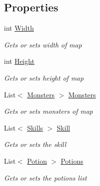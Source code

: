 \subsection*{Properties}
\begin{DoxyCompactItemize}
\item 
int \hyperlink{class_lightdeath_1_1_maps_a7f64d70e6c35d3c3e40f344aaa86c524}{Width}
\begin{DoxyCompactList}\small\item\em Gets or sets width of map \end{DoxyCompactList}\item 
int \hyperlink{class_lightdeath_1_1_maps_a889e0089e6b8bf717cad36a5e8724d3f}{Height}
\begin{DoxyCompactList}\small\item\em Gets or sets height of map \end{DoxyCompactList}\item 
List$<$ \hyperlink{class_lightdeath_1_1_monsters}{Monsters} $>$ \hyperlink{class_lightdeath_1_1_maps_a90188e7f4e8ffd7e90e4121a3f2ec114}{Monsters}
\begin{DoxyCompactList}\small\item\em Gets or sets monsters of map \end{DoxyCompactList}\item 
List$<$ \hyperlink{class_lightdeath_1_1_skills}{Skills} $>$ \hyperlink{class_lightdeath_1_1_maps_abf1b73c5a4ba428290a1a09241d764a3}{Skill}
\begin{DoxyCompactList}\small\item\em Gets or sets the skill \end{DoxyCompactList}\item 
List$<$ \hyperlink{class_lightdeath_1_1_potion}{Potion} $>$ \hyperlink{class_lightdeath_1_1_maps_af8070646d93782021f72a96dca1721f7}{Potions}
\begin{DoxyCompactList}\small\item\em Gets or sets the potions list \end{DoxyCompactList}\item 

\end{DoxyCompactItemize}
